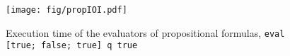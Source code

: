\begin{figure}[h]
  \centering
\texttt{[image: fig/propIOI.pdf]}
  \caption{Execution time of the evaluators of propositional formulas, \lstinline{eval [true; false; true] q true}}
  \label{fig:prop_time}
\end{figure}
